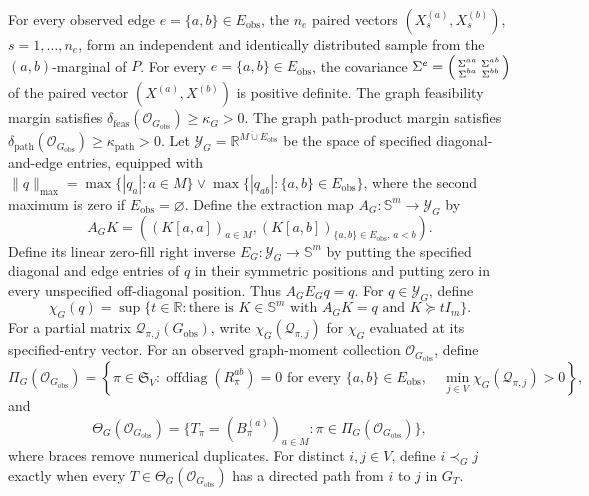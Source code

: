 For every observed edge \(e=\{a,b\}\in E_{\mathrm{obs}}\), the \(n_e\) paired vectors \((X_s^{(a)},X_s^{(b)})\), \(s=1,\ldots,n_e\), form an independent and identically distributed sample from the \((a,b)\)-marginal of \(P\).
For every \(e=\{a,b\}\in E_{\mathrm{obs}}\), the covariance \(\Sigma^e=\begin{psmallmatrix}\Sigma^{aa}&\Sigma^{ab}\\\Sigma^{ba}&\Sigma^{bb}\end{psmallmatrix}\) of the paired vector \((X^{(a)},X^{(b)})\) is positive definite.
The graph feasibility margin satisfies \(\delta_{\mathrm{feas}}(\mathcal O_{G_{\mathrm{obs}}})\ge\kappa_G>0\).
The graph path-product margin satisfies \(\delta_{\mathrm{path}}(\mathcal O_{G_{\mathrm{obs}}})\ge\kappa_{\mathrm{path}}>0\).
Let \(\mathcal Y_G=\mathbb R^{M\mathbin{\dot\cup}E_{\mathrm{obs}}}\) be the space of specified diagonal-and-edge entries, equipped with \(\|q\|_{\max}=\max\{|q_a|:a\in M\}\vee\max\{|q_{ab}|:\{a,b\}\in E_{\mathrm{obs}}\}\), where the second maximum is zero if \(E_{\mathrm{obs}}=\varnothing\).  Define the extraction map \(A_G:\mathbb S^m\to\mathcal Y_G\) by
\[
A_GK=((K[a,a])_{a\in M},(K[a,b])_{\{a,b\}\in E_{\mathrm{obs}},\,a<b}).
\]
Define its linear zero-fill right inverse \(E_G:\mathcal Y_G\to\mathbb S^m\) by putting the specified diagonal and edge entries of \(q\) in their symmetric positions and putting zero in every unspecified off-diagonal position.  Thus \(A_GE_Gq=q\).  For \(q\in\mathcal Y_G\), define
\[
\chi_G(q)=\sup\{t\in\mathbb R:\text{there is }K\in\mathbb S^m\text{ with }A_GK=q\text{ and }K\succeq tI_m\}.
\]
For a partial matrix \(\mathcal Q_{\pi,j}(G_{\mathrm{obs}})\), write \(\chi_G(\mathcal Q_{\pi,j})\) for \(\chi_G\) evaluated at its specified-entry vector.
For an observed graph-moment collection \(\mathcal O_{G_{\mathrm{obs}}}\), define
\[
\Pi_G(\mathcal O_{G_{\mathrm{obs}}})=
\left\{\pi\in\mathfrak S_V:
\operatorname{offdiag}(R_\pi^{ab})=0\text{ for every }\{a,b\}\in E_{\mathrm{obs}},\quad
\min_{j\in V}\chi_G(\mathcal Q_{\pi,j})>0
\right\},
\]
and
\[
\Theta_G(\mathcal O_{G_{\mathrm{obs}}})=
\{T_\pi=(B_\pi^{(a)})_{a\in M}:\pi\in\Pi_G(\mathcal O_{G_{\mathrm{obs}}})\},
\]
where braces remove numerical duplicates.  For distinct \(i,j\in V\), define \(i\prec_Gj\) exactly when every \(T\in\Theta_G(\mathcal O_{G_{\mathrm{obs}}})\) has a directed path from \(i\) to \(j\) in \(G_T\).
